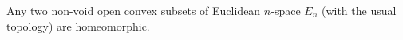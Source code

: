 Any two non-void open convex subsets of Euclidean $n$-space $E_n$ (with the usual topology) are homeomorphic.
